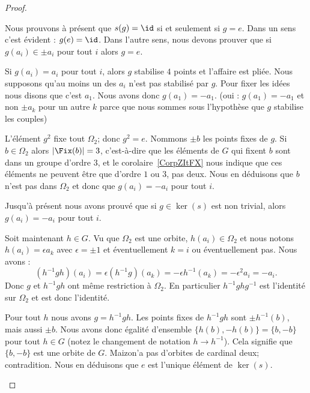 \begin{proof}
\begin{subproof}
\begin{subproof}
                    Nous prouvons à présent que \( s(g)=\id\) si et seulement si \( g=e\). Dans un sens c'est évident : \( g(e)=\id\). Dans l'autre sens, nous devons prouver que si \( g(a_i)\in \pm a_i\) pour tout \( i\) alors \( g=e\).

                    Si \( g(a_i)=a_i\) pour tout \( i\), alors \( g\) stabilise \( 4\) points et l'affaire est pliée. Nous supposons qu'au moins un des \( a_i\) n'est pas stabilisé par \( g\). Pour fixer les idées nous disons que c'est \( a_1\). Nous avons donc \( g(a_1)=-a_1\). (oui : \( g(a_1)=-a_1\) et non \( \pm a_k\) pour un autre \( k\) parce que nous sommes sous l'hypothèse que \( g\) stabilise les couples)

                    L'élément \( g^2\) fixe tout \( \Omega_2\); donc \( g^2=e\). Nommons \( \pm b\) les points fixes de \( g\). Si \( b\in \Omega_2\) alors \( | \Fix(b) |=3\), c'est-à-dire que les éléments de \( G\) qui fixent \( b\) sont dans un groupe d'ordre \( 3\), et le corolaire~\ref{CorpZItFX} nous indique que ces éléments ne peuvent être que d'ordre \( 1\) ou \( 3\), pas deux. Nous en déduisons que \( b\) n'est pas dans \( \Omega_2\) et donc que \( g(a_i)=-a_i\) pour tout \( i\).

                    Jusqu'à présent nous avons prouvé que si \( g\in \ker(s)\) est non trivial,  alors \( g(a_i)=-a_i\) pour tout \( i\).

                    Soit maintenant \( h\in G\). Vu que \( \Omega_2\) est une orbite, \( h(a_i)\in \Omega_2\) et nous notons \( h(a_i)=\epsilon a_k\) avec \( \epsilon=\pm 1\) et éventuellement \( k=i\) ou éventuellement pas. Nous avons :
                    \begin{equation}
                        (h^{-1}gh)(a_i)=\epsilon (h^{-1} g)(a_k)=-\epsilon h^{-1}(a_k)=-\epsilon^2 a_i=-a_i.
                    \end{equation}
                    Donc \( g\) et \( h^{-1} g h\) ont même restriction à \( \Omega_2\). En particulier \( h^{-1} ghg^{-1}\) est l'identité sur \( \Omega_2\) et est donc l'identité.

                    Pour tout \( h\) nous avons \( g=h^{-1} gh\). Les points fixes de \( h^{-1}g h\) sont \( \pm h^{-1}(b)\), mais aussi \( \pm b\). Nous avons donc égalité d'ensemble \( \{ h(b),-h(b) \}=\{ b,-b \}\) pour tout \( h\in G\) (notez le changement de notation \( h\to h^{-1}\)). Cela signifie que \( \{ b,-b \}\) est une orbite de \( G\). Maizon'a pas d'orbites de cardinal deux; contradition. Nous en déduisons que \( e\) est l'unique élément de \( \ker(s)\).


\end{subproof}
\end{subproof}
\end{proof}
